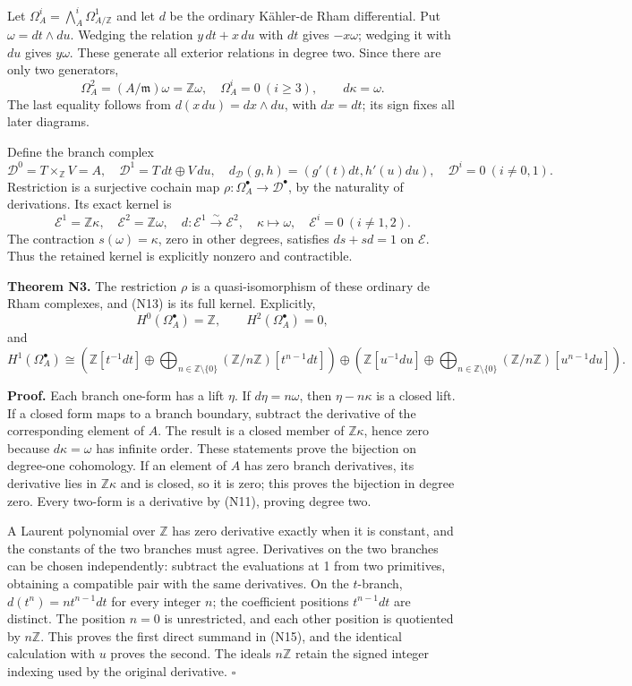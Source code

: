 \documentclass[
]{article}
\begin{document}
Let \(\Omega^i_A=\bigwedge^i_A\Omega^1_{A/\mathbb Z}\) and let \(d\) be
the ordinary Kähler-de Rham differential. Put \(\omega=dt\wedge du\).
Wedging the relation \(y\,dt+x\,du\) with \(dt\) gives \(-x\omega\);
wedging it with \(du\) gives \(y\omega\). These generate all exterior
relations in degree two. Since there are only two generators, \[
\Omega^2_A=(A/\mathfrak m)\omega=\mathbb Z\omega,
\quad \Omega^i_A=0\ (i\ge3),\qquad d\kappa=\omega.
\tag{N11}
\] The last equality follows from \(d(x\,du)=dx\wedge du\), with
\(dx=dt\); its sign fixes all later diagrams.

Define the branch complex \[
\mathcal D^0=T\times_{\mathbb Z}V=A,
\quad\mathcal D^1=T\,dt\oplus V\,du,
\quad d_{\mathcal D}(g,h)=(g'(t)dt,h'(u)du),
\quad\mathcal D^i=0\ (i\ne0,1).
\tag{N12}
\] Restriction is a surjective cochain map
\(\rho:\Omega^\bullet_A\to\mathcal D^\bullet\), by the naturality of
derivations. Its exact kernel is \[
\mathcal E^1=\mathbb Z\kappa,
\quad\mathcal E^2=\mathbb Z\omega,
\quad d:\mathcal E^1\xrightarrow{\sim}\mathcal E^2,
\quad\kappa\longmapsto\omega,
\quad\mathcal E^i=0\ (i\ne1,2).
\tag{N13}
\] The contraction \(s(\omega)=\kappa\), zero in other degrees,
satisfies \(ds+sd=1\) on \(\mathcal E\). Thus the retained kernel is
explicitly nonzero and contractible.

\textbf{Theorem N3.} The restriction \(\rho\) is a quasi-isomorphism of
these ordinary de Rham complexes, and (N13) is its full kernel.
Explicitly, \[
H^0(\Omega^\bullet_A)=\mathbb Z,\qquad H^2(\Omega^\bullet_A)=0,
\tag{N14}
\] and \[
H^1(\Omega^\bullet_A)\cong
\left(\mathbb Z[t^{-1}dt]\oplus
\bigoplus_{n\in\mathbb Z\setminus\{0\}}(\mathbb Z/n\mathbb Z)[t^{n-1}dt]\right)
\oplus
\left(\mathbb Z[u^{-1}du]\oplus
\bigoplus_{n\in\mathbb Z\setminus\{0\}}(\mathbb Z/n\mathbb Z)[u^{n-1}du]\right).
\tag{N15}
\]

\textbf{Proof.} Each branch one-form has a lift \(\eta\). If
\(d\eta=n\omega\), then \(\eta-n\kappa\) is a closed lift. If a closed
form maps to a branch boundary, subtract the derivative of the
corresponding element of \(A\). The result is a closed member of
\(\mathbb Z\kappa\), hence zero because \(d\kappa=\omega\) has infinite
order. These statements prove the bijection on degree-one cohomology. If
an element of \(A\) has zero branch derivatives, its derivative lies in
\(\mathbb Z\kappa\) and is closed, so it is zero; this proves the
bijection in degree zero. Every two-form is a derivative by (N11),
proving degree two.

A Laurent polynomial over \(\mathbb Z\) has zero derivative exactly when
it is constant, and the constants of the two branches must agree.
Derivatives on the two branches can be chosen independently: subtract
the evaluations at 1 from two primitives, obtaining a compatible pair
with the same derivatives. On the \(t\)-branch, \(d(t^n)=n t^{n-1}dt\)
for every integer \(n\); the coefficient positions \(t^{n-1}dt\) are
distinct. The position \(n=0\) is unrestricted, and each other position
is quotiented by \(n\mathbb Z\). This proves the first direct summand in
(N15), and the identical calculation with \(u\) proves the second. The
ideals \(n\mathbb Z\) retain the signed integer indexing used by the
original derivative. \(\square\)
\end{document}
